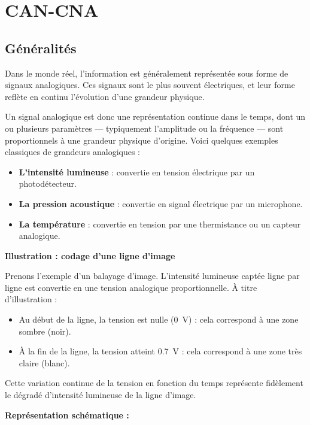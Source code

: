 \section{CAN-CNA}
\subsection{Généralités}

Dans le monde réel, l'information est généralement représentée sous forme de 
signaux analogiques. Ces signaux sont le plus souvent électriques, et leur forme 
reflète en continu l'évolution d'une grandeur physique.\par

Un signal analogique est donc une représentation continue dans le temps, dont un 
ou plusieurs paramètres — typiquement l’amplitude ou la fréquence — sont 
proportionnels à une grandeur physique d’origine. Voici quelques exemples 
classiques de grandeurs analogiques :

\begin{itemize}
    \item \textbf{L’intensité lumineuse} : convertie en tension électrique par un photodétecteur.
    \item \textbf{La pression acoustique} : convertie en signal électrique par un microphone.
    \item \textbf{La température} : convertie en tension par une thermistance ou un capteur analogique.
\end{itemize}

\textbf{\sffamily Illustration : codage d’une ligne d’image}

Prenons l’exemple d’un balayage d’image. L’intensité lumineuse captée ligne par 
ligne est convertie en une tension analogique proportionnelle. À titre 
d’illustration :

\begin{itemize}
    \item Au début de la ligne, la tension est nulle (\SI{0}{\volt}) : cela correspond à une zone sombre (noir).
    \item À la fin de la ligne, la tension atteint \SI{0.7}{\volt} : cela correspond à une zone très claire (blanc).
\end{itemize}

Cette variation continue de la tension en fonction du temps représente 
fidèlement le dégradé d’intensité lumineuse de la ligne d’image.

\vspace{0.5cm}
\textbf{\sffamily Représentation schématique :}

